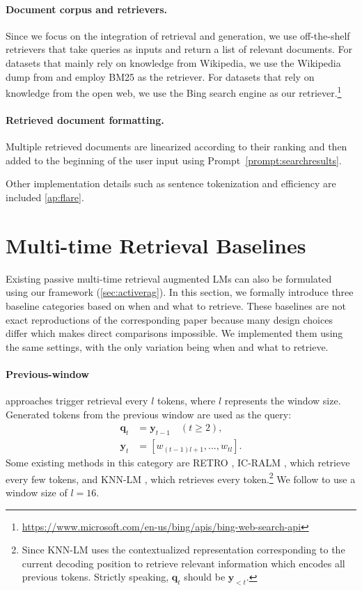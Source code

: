 \paragraph{Document corpus and retrievers.}
Since we focus on the integration of retrieval and generation, we use off-the-shelf retrievers that take queries as inputs and return a list of relevant documents.
For datasets that mainly rely on knowledge from Wikipedia, we use the Wikipedia dump from \citet{dpr-2020-karpukhin} and employ BM25 \cite{bm25-2009-robertson} as the retriever.
For datasets that rely on knowledge from the open web, we use the Bing search engine as our retriever.\footnote{\url{https://www.microsoft.com/en-us/bing/apis/bing-web-search-api}}

\paragraph{Retrieved document formatting.}
Multiple retrieved documents are linearized according to their ranking and then added to the beginning of the user input using Prompt~\autoref{prompt:searchresults}.

Other implementation details such as sentence tokenization and efficiency are included \autoref{ap:flare}.

\section{Multi-time Retrieval Baselines}\label{sec:baseline_multi}
Existing passive multi-time retrieval augmented LMs can also be formulated using our framework (\autoref{sec:activerag}).
In this section, we formally introduce three baseline categories based on when and what to retrieve.
These baselines are not exact reproductions of the corresponding paper because many design choices differ which makes direct comparisons impossible.
We implemented them using the same settings, with the only variation being when and what to retrieve.

\paragraph{Previous-window} approaches trigger retrieval every $l$ tokens, where $l$ represents the window size. Generated tokens from the previous window are used as the query:
\begin{align*}
\bm{q}_t &= \bm{y}_{t-1} \quad (t \ge 2), \\
\bm{y}_t &= [w_{(t-1)l+1},..., w_{tl}].
\end{align*}
Some existing methods in this category are RETRO \cite{retro-borgeaud-2022}, IC-RALM \cite{icrlm-ram-2023}, which retrieve every few tokens, and KNN-LM \cite{knnlm-2020-khandelwal}, which retrieves every token.\footnote{Since KNN-LM uses the contextualized representation corresponding to the current decoding position to retrieve relevant information which encodes all previous tokens. Strictly speaking, $\bm{q}_t$ should be $\bm{y}_{<t}$.}
We follow \citet{icrlm-ram-2023} to use a window size of $l=16$.

